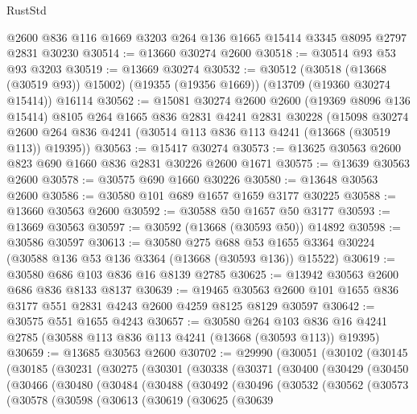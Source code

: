 \begin{lexlean}{RustStd}
\begin{coremodule}
    @2600
    @836
    @116
    @1669
    @3203
    @264
    @136
    @1665
    @15414
    @3345
    @8095
    @2797
    @2831
    @30230
@30514 := @13660 @30274 @2600
@30518 := @30514 @93 @53 @93 @3203
@30519 := @13669 @30274
@30532 := @30512
    (@30518 (@13668 (@30519 @93)) @15002)
    (@19355 (@19356 @1669))
    (@13709 (@19360 @30274 @15414))
    @16114
@30562 := @15081
    @30274
    @2600
    @2600
    (@19369 @8096 @136 @15414)
    @8105
    @264
    @1665
    @836
    @2831
    @4241
    @2831
    @30228
    (@15098
      @30274
      @2600
      @264
      @836
      @4241
      (@30514 @113 @836 @113 @4241 (@13668 (@30519 @113)) @19395))
@30563 := @15417 @30274
@30573 := @13625 @30563 @2600 @823 @690 @1660 @836 @2831 @30226 @2600 @1671
@30575 := @13639 @30563 @2600
@30578 := @30575 @690 @1660 @30226
@30580 := @13648 @30563 @2600
@30586 := @30580 @101 @689 @1657 @1659 @3177 @30225
@30588 := @13660 @30563 @2600
@30592 := @30588 @50 @1657 @50 @3177
@30593 := @13669 @30563
@30597 := @30592 (@13668 (@30593 @50)) @14892
@30598 := @30586 @30597
@30613 := @30580
    @275
    @688
    @53
    @1655
    @3364
    @30224
    (@30588 @136 @53 @136 @3364 (@13668 (@30593 @136)) @15522)
@30619 := @30580 @686 @103 @836 @16 @8139 @2785
@30625 := @13942 @30563 @2600 @686 @836 @8133 @8137
@30639 := @19465 @30563 @2600 @101 @1655 @836 @3177 @551 @2831 @4243 @2600 @4259 @8125 @8129 @30597
@30642 := @30575 @551 @1655 @4243
@30657 := @30580
    @264
    @103
    @836
    @16
    @4241
    @2785
    (@30588 @113 @836 @113 @4241 (@13668 (@30593 @113)) @19395)
@30659 := @13685 @30563 @2600
@30702 := @29990
    (@30051
      (@30102
        (@30145
          (@30185
            (@30231
              (@30275
                (@30301
                  (@30338
                    (@30371
                      (@30400
                        (@30429
                          (@30450
                            (@30466
                              (@30480
                                (@30484
                                  (@30488
                                    (@30492
                                      (@30496
                                        (@30532
                                          (@30562
                                            (@30573
                                              (@30578
                                                (@30598
                                                  (@30613
                                                    (@30619
                                                      (@30625
                                                        (@30639

\end{coremodule}
\end{lexlean}
